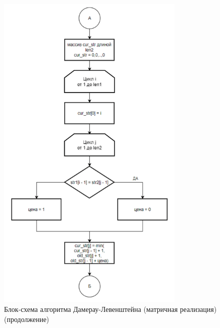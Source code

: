 \begin{figure}[H]
    \centering
    \includegraphics[width=0.8\textwidth]{img/block_2_1_2.png}
    \caption{Блок-схема алгоритма Дамерау-Левенштейна (матричная реализация)\\ (продолжение)}
    \label{fig:block_2_1_2}
\end{figure}

